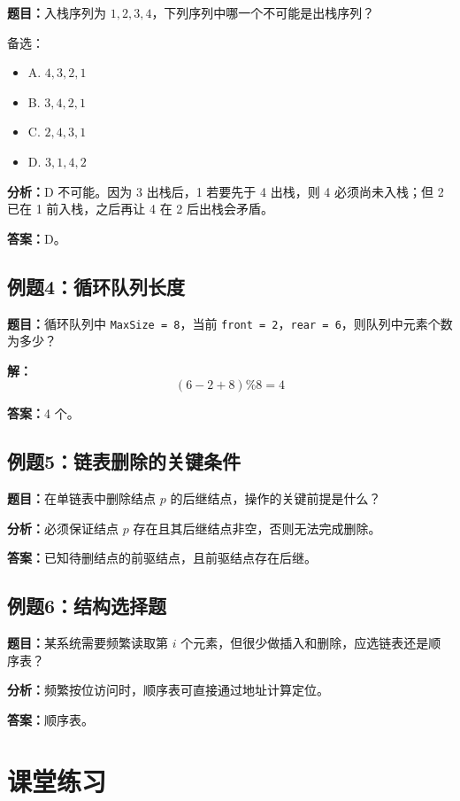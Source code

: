 \documentclass{../../note}
\begin{document}
\textbf{题目：}入栈序列为 $1,2,3,4$，下列序列中哪一个不可能是出栈序列？

备选：
\begin{itemize}
  \item A. $4,3,2,1$
  \item B. $3,4,2,1$
  \item C. $2,4,3,1$
  \item D. $3,1,4,2$
\end{itemize}

\textbf{分析：}D 不可能。因为 3 出栈后，1 若要先于 4 出栈，则 4 必须尚未入栈；但 2 已在 1 前入栈，之后再让 4 在 2 后出栈会矛盾。

\textbf{答案：}D。

\subsection{例题4：循环队列长度}

\textbf{题目：}循环队列中 \texttt{MaxSize = 8}，当前 \texttt{front = 2}，\texttt{rear = 6}，则队列中元素个数为多少？

\textbf{解：}
\[
(6 - 2 + 8) \% 8 = 4
\]

\textbf{答案：}4 个。

\subsection{例题5：链表删除的关键条件}

\textbf{题目：}在单链表中删除结点 $p$ 的后继结点，操作的关键前提是什么？

\textbf{分析：}必须保证结点 $p$ 存在且其后继结点非空，否则无法完成删除。

\textbf{答案：}已知待删结点的前驱结点，且前驱结点存在后继。

\subsection{例题6：结构选择题}

\textbf{题目：}某系统需要频繁读取第 $i$ 个元素，但很少做插入和删除，应选链表还是顺序表？

\textbf{分析：}频繁按位访问时，顺序表可直接通过地址计算定位。

\textbf{答案：}顺序表。

\section{课堂练习}
\end{document}
